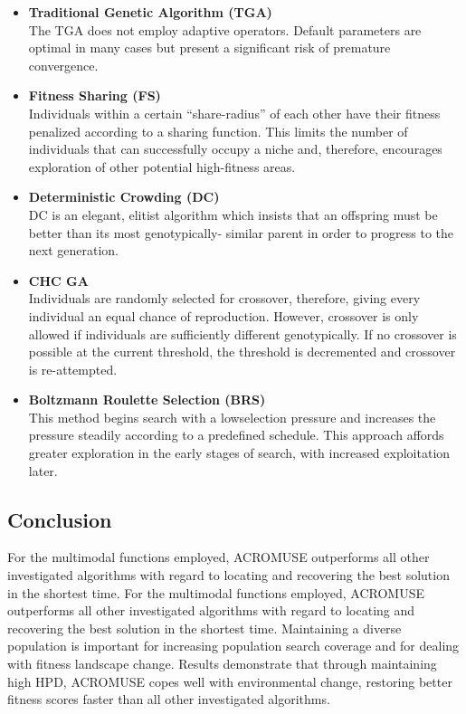 \documentclass[../main.tex]{subfiles}
\begin{document}
\begin{itemize}
	\item \textbf{Traditional Genetic Algorithm (TGA)} \\
	The TGA does not employ adaptive operators. Default parameters are optimal in many cases but present a significant risk of premature convergence.

	\item \textbf{Fitness Sharing (FS)} \\
	Individuals within a certain ``share-radius'' of each other have their fitness penalized according to a sharing
	function. This limits the number of individuals that can successfully occupy a niche and, therefore, encourages
	exploration of other potential high-fitness areas.

	\item \textbf{Deterministic Crowding (DC)} \\
	DC is an elegant, elitist algorithm which insists that an offspring must be better than its most genotypically-
	similar parent in order to progress to the next generation.

	\item \textbf{CHC GA} \\
	Individuals are randomly selected for crossover, therefore, giving every individual an equal chance of
	reproduction. However, crossover is only allowed if individuals are sufficiently different genotypically. If no
	crossover is possible at the current threshold, the threshold is decremented and
	crossover is re-attempted.

	\item \textbf{Boltzmann Roulette Selection (BRS)} \\
	This method begins search with a lowselection pressure and increases the pressure steadily according to a
	predefined schedule. This approach affords greater exploration in the early stages of search, with increased
	exploitation later.
\end{itemize}

\subsection{Conclusion}
For the multimodal functions employed, ACROMUSE outperforms all other investigated algorithms with regard to locating
and recovering the best solution in the shortest time. For the multimodal functions employed, ACROMUSE outperforms all
other investigated algorithms with regard to locating and recovering the best solution in the shortest time.
Maintaining a diverse population is important for increasing population search coverage and for dealing with fitness
landscape change. Results demonstrate that through maintaining high HPD, ACROMUSE copes well with environmental change,
restoring better fitness scores faster than all other investigated algorithms.
\end{document}
